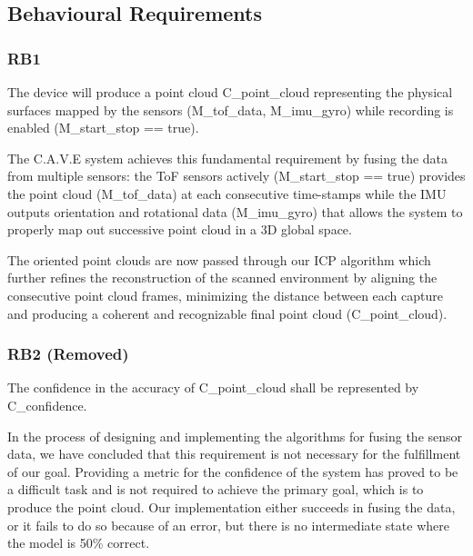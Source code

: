 \documentclass[11pt]{article}
\begin{document}
	
	\subsection{Behavioural Requirements} 
	
	\subsubsection{RB1} 
	
	\begin{exampleblock}
		The device will produce a point cloud C\_point\_cloud representing the physical surfaces mapped by the sensors (M\_tof\_data, M\_imu\_gyro) while recording is enabled (M\_start\_stop == true).
	\end{exampleblock}
	
	The C.A.V.E system achieves this fundamental requirement by fusing the data from multiple sensors: the ToF sensors actively (M\_start\_stop == true) provides the point cloud (M\_tof\_data) at each consecutive time-stamps while the IMU outputs orientation and rotational data (M\_imu\_gyro) that allows the system to properly map out successive point cloud in a 3D global space.
	
	The oriented point clouds are now passed through our ICP algorithm which further refines the reconstruction of the scanned environment by aligning the consecutive point cloud frames, minimizing the distance between each capture and producing a coherent and recognizable final point cloud (C\_point\_cloud).
	
	\subsubsection{RB2 (Removed)}
	 
	\begin{exampleblock}[red]
		The confidence in the accuracy of C\_point\_cloud shall be represented by C\_confidence.
	\end{exampleblock}
	
	In the process of designing and implementing the algorithms for fusing the sensor data, we have concluded that this requirement is not necessary for the fulfillment of our goal. Providing a metric for the confidence of the system has proved to be a difficult task and is not required to achieve the primary goal, which is to produce the point cloud. Our implementation either succeeds in fusing the data, or it fails to do so because of an error, but there is no intermediate state where the model is 50\% correct. 
	
\end{document}

